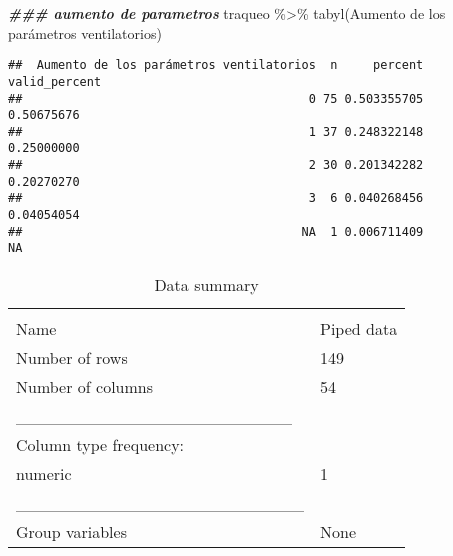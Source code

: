 \documentclass[
]{article}
\newenvironment{Shaded}{\begin{snugshade}}{\end{snugshade}}
\newcommand{\AttributeTok}[1]{\textcolor[rgb]{0.77,0.63,0.00}{#1}}
\newcommand{\DocumentationTok}[1]{\textcolor[rgb]{0.56,0.35,0.01}{\textbf{\textit{#1}}}}
\newcommand{\FunctionTok}[1]{\textcolor[rgb]{0.00,0.00,0.00}{#1}}
\newcommand{\NormalTok}[1]{#1}
\newcommand{\OtherTok}[1]{\textcolor[rgb]{0.56,0.35,0.01}{#1}}
\newcommand{\SpecialCharTok}[1]{\textcolor[rgb]{0.00,0.00,0.00}{#1}}
\newcommand{\StringTok}[1]{\textcolor[rgb]{0.31,0.60,0.02}{#1}}
\begin{document}
\begin{Shaded}
\begin{Highlighting}[]
\DocumentationTok{\#\#\# aumento de parametros}
\NormalTok{traqueo }\SpecialCharTok{\%\textgreater{}\%}
  \FunctionTok{tabyl}\NormalTok{(}\StringTok{\textasciigrave{}}\AttributeTok{Aumento de los parámetros ventilatorios}\StringTok{\textasciigrave{}}\NormalTok{)}
\end{Highlighting}
\end{Shaded}

\begin{verbatim}
##  Aumento de los parámetros ventilatorios  n     percent valid_percent
##                                        0 75 0.503355705    0.50675676
##                                        1 37 0.248322148    0.25000000
##                                        2 30 0.201342282    0.20270270
##                                        3  6 0.040268456    0.04054054
##                                       NA  1 0.006711409            NA
\end{verbatim}

\begin{Shaded}
\end{Shaded}

\begin{longtable}[]{@{}ll@{}}
\caption{Data summary}\tabularnewline
\toprule
& \\
\midrule
\endfirsthead
\toprule
& \\
\midrule
\endhead
Name & Piped data \\
Number of rows & 149 \\
Number of columns & 54 \\
\_\_\_\_\_\_\_\_\_\_\_\_\_\_\_\_\_\_\_\_\_\_\_ & \\
Column type frequency: & \\
numeric & 1 \\
\_\_\_\_\_\_\_\_\_\_\_\_\_\_\_\_\_\_\_\_\_\_\_\_ & \\
Group variables & None \\
\bottomrule
\end{longtable}
\end{document}
